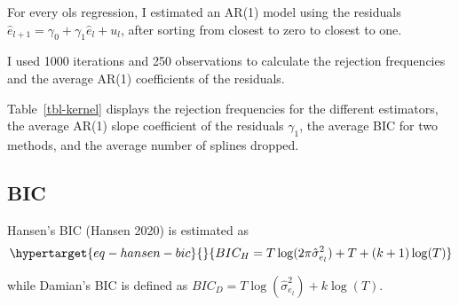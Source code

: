 \documentclass[
]{article}
\begin{document}
For every ols regression, I estimated an AR(1) model using the residuals
\(\hat{e}_{l+1}=\gamma_0+\gamma_1 \hat{e}_l + u_l\), after sorting from
closest to zero to closest to one.

I used 1000 iterations and 250 observations to calculate the rejection
frequencies and the average AR(1) coefficients of the residuals.

Table~\ref{tbl-kernel} displays the rejection frequencies for the
different estimators, the average AR(1) slope coefficient of the
residuals \(\gamma_1\), the average BIC for two methods, and the average
number of splines dropped.

\hypertarget{bic}{%
\subsection{BIC}\label{bic}}

Hansen's BIC (Hansen 2020) is estimated as
\begin{equation}\protect\hypertarget{eq-hansen-bic}{}{
BIC_H=T\log(2\pi\hat{\sigma}^2_{e_l})+T+(k+1)\log(T)
}\label{eq-hansen-bic}\end{equation}

while Damian's BIC is defined as
\(BIC_D=T\log(\hat{\sigma}^2_{e_l})+k\log(T)\).
\end{document}
